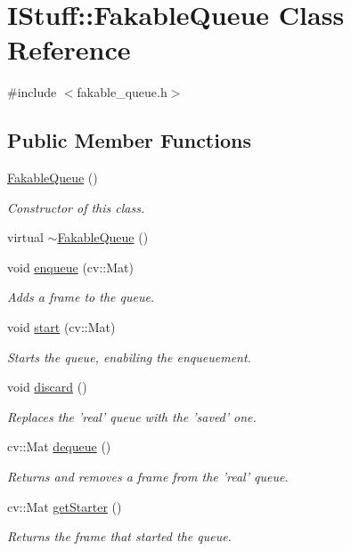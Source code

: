 \hypertarget{class_i_stuff_1_1_fakable_queue}{\section{I\-Stuff\-:\-:Fakable\-Queue Class Reference}
\label{class_i_stuff_1_1_fakable_queue}
}


{\ttfamily \#include $<$fakable\-\_\-queue.\-h$>$}

\subsection*{Public Member Functions}
\begin{DoxyCompactItemize}
\item 
\hyperlink{class_i_stuff_1_1_fakable_queue_a22906efd165f0becf24bc4056b966fb6}{Fakable\-Queue} ()
\begin{DoxyCompactList}\small\item\em Constructor of this class. \end{DoxyCompactList}\item 
virtual \hyperlink{class_i_stuff_1_1_fakable_queue_a9675cd13bcaa59d614d47127c0c21d93}{$\sim$\-Fakable\-Queue} ()
\item 
void \hyperlink{class_i_stuff_1_1_fakable_queue_a2d615a3f5fb3bbe26bd99694bd1a2378}{enqueue} (cv\-::\-Mat)
\begin{DoxyCompactList}\small\item\em Adds a frame to the queue. \end{DoxyCompactList}\item 
void \hyperlink{class_i_stuff_1_1_fakable_queue_acb05a50ab738a9df2cccf7b697c199ca}{start} (cv\-::\-Mat)
\begin{DoxyCompactList}\small\item\em Starts the queue, enabiling the enqueuement. \end{DoxyCompactList}\item 
void \hyperlink{class_i_stuff_1_1_fakable_queue_a5f103ad2380d4aaf9c38c8853c3c97a9}{discard} ()
\begin{DoxyCompactList}\small\item\em Replaces the 'real' queue with the 'saved' one. \end{DoxyCompactList}\item 
cv\-::\-Mat \hyperlink{class_i_stuff_1_1_fakable_queue_a45d9c3549edcd23c87d70142db01df05}{dequeue} ()
\begin{DoxyCompactList}\small\item\em Returns and removes a frame from the 'real' queue. \end{DoxyCompactList}\item 
cv\-::\-Mat \hyperlink{class_i_stuff_1_1_fakable_queue_aea66bd432f26ee1322387dc5589b721d}{get\-Starter} ()
\begin{DoxyCompactList}\small\item\em Returns the frame that started the queue. \end{DoxyCompactList}\end{DoxyCompactItemize}
